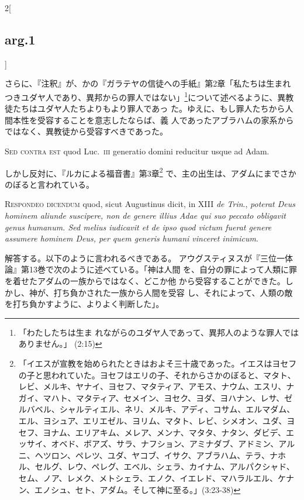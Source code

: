 \documentclass[paper=a4paper,fontsize=10pt,jafontsize=9pt,titlepage]{jlreq}
\begin{document}
\begin{paracol}{2}[\subsection{arg.1}]
\switchcolumn

さらに、『注釈』が、かの『ガラテヤの信徒への手紙』第2章「私たちは生まれ
 つきユダヤ人であり、異邦からの罪人ではない」\footnote{「わたしたちは生ま
 れながらのユダヤ人であって、異邦人のような罪人ではありません。」
 (2:15)}について述べるように、異教徒たちはユダヤ人たちよりもより罪人であっ
 た。ゆえに、もし罪人たちから人間本性を受容することを意志したならば、義
 人であったアブラハムの家系からではなく、異教徒から受容すべきであった。

\switchcolumn*[\subsection{s.c.}]

{\scshape Sed contra est} quod Luc.~{\scshape iii} generatio domini reducitur usque ad Adam.

\switchcolumn

しかし反対に、『ルカによる福音書』第3章\footnote{「イエスが宣教を始められたときはおよそ三十歳であった。イエスはヨセフの子と思われていた。ヨセフはエリの子、それからさかのぼると、マタト、レビ、メルキ、ヤナイ、ヨセフ、マタティア、アモス、ナウム、エスリ、ナガイ、マハト、マタティア、セメイン、ヨセク、ヨダ、ヨハナン、レサ、ゼルバベル、シャルティエル、ネリ、メルキ、アディ、コサム、エルマダム、エル、ヨシュア、エリエゼル、ヨリム、マタト、レビ、シメオン、ユダ、ヨセフ、ヨナム、エリアキム、メレア、メンナ、マタタ、ナタン、ダビデ、エッサイ、オベド、ボアズ、サラ、ナフション、アミナダブ、アドミン、アルニ、ヘツロン、ペレツ、ユダ、ヤコブ、イサク、アブラハム、テラ、ナホル、セルグ、レウ、ペレグ、エベル、シェラ、カイナム、アルパクシャド、セム、ノア、レメク、メトシェラ、エノク、イエレド、マハラルエル、ケナン、エノシュ、セト、アダム。そして神に至る。」(3:23-38)} で、主の出生は、アダムにまでさか
 のぼると言われている。


{\scshape Respondeo dicendum} quod, sicut Augustinus dicit, in XIII {\itshape de Trin}.,
{\itshape poterat Deus hominem aliunde suscipere, non de genere illius Adae qui
suo peccato obligavit genus humanum. Sed melius iudicavit et de ipso
quod victum fuerat genere assumere hominem Deus, per quem generis humani
vinceret inimicum}.

\switchcolumn

解答する。以下のように言われるべきである。
アウグスティヌスが『三位一体論』第13巻で次のように述べている。「神は人間
 を、自分の罪によって人類に罪を着せたアダムの一族からではなく、どこか他
 から受容することができた。しかし、神が、打ち負かされた一族から人間を受容
 し、それによって、人類の敵を打ち負かすように、よりよく判断した」。


\end{paracol}
\end{document}
